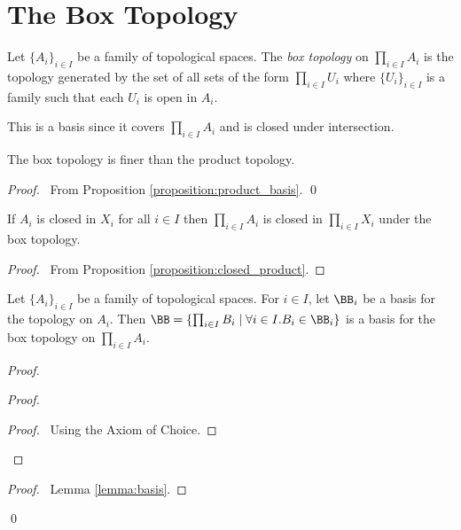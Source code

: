 \section{The Box Topology}

\begin{definition}
    Let $\{ A_i \}_{i \in I}$ be a family of topological spaces. The \emph{box topology} on $\prod_{i \in I} A_i$ is the topology generated by the set of all sets
    of the form $\prod_{i \in I} U_i$ where $\{ U_i \}_{i \in I}$ is a family such that each $U_i$ is open in $A_i$.
\end{definition}

This is a basis since it covers $\prod_{i \in I} A_i$ and is closed under intersection.

\begin{proposition}
    The box topology is finer than the product topology.
\end{proposition}

\begin{proof}
    \pf\ From Proposition \ref{proposition:product_basis}. \qed
\end{proof}

\begin{corollary}
    \label{corollary:closed_box}
        If $A_i$ is closed in $X_i$ for all $i \in I$ then $\prod_{i \in I} A_i$ is closed in $\prod_{i \in I} X_i$ under the box topology.    
\end{corollary}

\begin{proof}
    \pf\ From Proposition \ref{proposition:closed_product}.
\end{proof}

\begin{proposition}[AC]
    Let $\{ A_i \}_{i \in I}$ be a family of topological spaces. For $i \in I$, let $\BB_i$ be a basis for the topology on $A_i$. Then $\BB = \{ \prod_{i \in I} B_i \mid
    \forall i \in I. B_i \in \BB_i \}$ is a basis for the box topology on $\prod_{i \in I} A_i$.
\end{proposition}

\begin{proof}
    \pf
    \begin{proof}
        \begin{proof}
            \pf\ Using the Axiom of Choice.
        \end{proof}
    \end{proof}
    \qedstep
    \begin{proof}
        \pf\ Lemma \ref{lemma:basis}.
    \end{proof}
    \qed
\end{proof}

